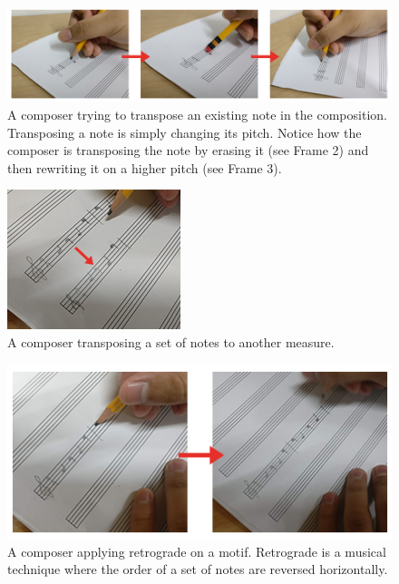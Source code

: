 		\begin{figure}[H]
			\centering
			\includegraphics[scale=0.46]{figures/handwritten-transpose-erase.png}
		    \caption{A composer trying to transpose an existing note in the composition. Transposing a note is simply changing its pitch. Notice how the composer is transposing the note by erasing it (see Frame 2) and then rewriting it on a higher pitch (see Frame 3).}
		    \label{fig:handwritten-transpose-erase}
		\end{figure}

		\begin{figure}[H]
			\centering
			\includegraphics[scale=1.0]{figures/handwritten-transpose-measure.png}
		    \caption{A composer transposing a set of notes to another measure.}
		    \label{fig:handwritten-transpose-measure}
		\end{figure}

		\begin{figure}[H]
			\centering
			\includegraphics[scale=0.9]{figures/handwritten-retrograde.png}
		    \caption{A composer applying retrograde on a motif. Retrograde is a musical technique where the order of a set of notes are reversed horizontally.}
		    \label{fig:handwritten-retrograde}
		\end{figure}


